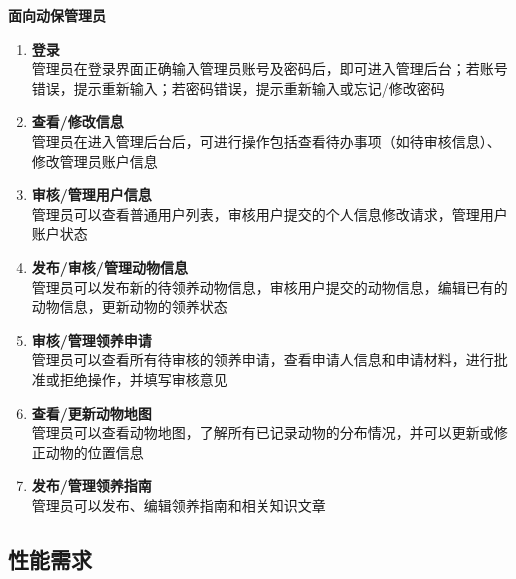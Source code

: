 \documentclass[12pt,a4paper,UTF8]{article}
\begin{document}
\noindent\textbf{面向动保管理员}
\begin{enumerate}
    \item \textbf{登录} \\
    管理员在登录界面正确输入管理员账号及密码后，即可进入管理后台；若账号错误，提示重新输入；若密码错误，提示重新输入或忘记/修改密码
    \item \textbf{查看/修改信息} \\
    管理员在进入管理后台后，可进行操作包括查看待办事项（如待审核信息）、修改管理员账户信息
    \item \textbf{审核/管理用户信息} \\
    管理员可以查看普通用户列表，审核用户提交的个人信息修改请求，管理用户账户状态
    \item \textbf{发布/审核/管理动物信息} \\
    管理员可以发布新的待领养动物信息，审核用户提交的动物信息，编辑已有的动物信息，更新动物的领养状态
    \item \textbf{审核/管理领养申请} \\
    管理员可以查看所有待审核的领养申请，查看申请人信息和申请材料，进行批准或拒绝操作，并填写审核意见
    \item \textbf{查看/更新动物地图} \\
    管理员可以查看动物地图，了解所有已记录动物的分布情况，并可以更新或修正动物的位置信息
    \item \textbf{发布/管理领养指南} \\
    管理员可以发布、编辑领养指南和相关知识文章
\end{enumerate}

\subsection{性能需求}
\end{document}

